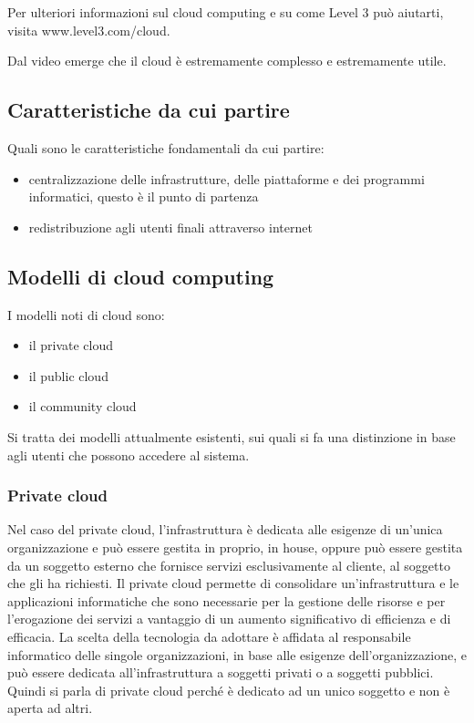 Per ulteriori informazioni sul cloud computing e su come Level 3 può aiutarti, visita www.level3.com/cloud.

Dal video emerge che il cloud è estremamente complesso e estremamente utile. 

\subsection{Caratteristiche da cui partire}
Quali sono le caratteristiche fondamentali da cui partire:

\begin{itemize}
    \item centralizzazione delle infrastrutture, delle piattaforme e dei programmi informatici, questo è il punto di partenza 
    \item redistribuzione agli utenti finali attraverso internet 
\end{itemize}

\subsection{Modelli di cloud computing}

I modelli noti di cloud sono:
\begin{itemize}
    \item il private cloud
    \item il public cloud
    \item il community cloud
\end{itemize}



Si tratta dei modelli attualmente esistenti, sui quali si fa una distinzione in base agli utenti che possono accedere al sistema. 

\subsubsection{Private cloud}
Nel caso del private cloud, l'infrastruttura è dedicata alle esigenze di un'unica organizzazione e può essere gestita in proprio, in house, oppure può essere gestita da un soggetto esterno che fornisce servizi esclusivamente al cliente, al soggetto che gli ha richiesti. Il private cloud permette di consolidare un'infrastruttura e le applicazioni informatiche che sono necessarie per la gestione delle risorse e per l'erogazione dei servizi a vantaggio di un aumento significativo di efficienza e di efficacia. La scelta della tecnologia da adottare è affidata al responsabile informatico delle singole organizzazioni, in base alle esigenze dell'organizzazione, e può essere dedicata all'infrastruttura a soggetti privati o a soggetti pubblici. 
Quindi si parla di private cloud perché è dedicato ad un unico soggetto e non è aperta ad altri.

